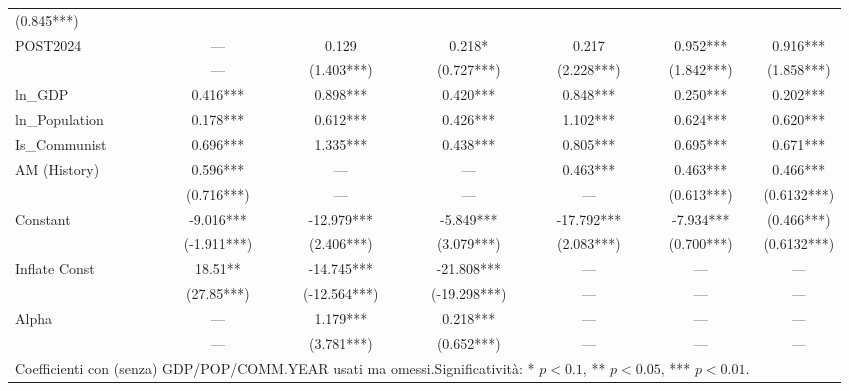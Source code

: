 \begin{table}[H]
{\begin{tabular}{l cccccc}
                (0.845***) \\
POST2024        & ---       & 0.129     & 0.218*    & 0.217     & 0.952*** &
0.916***  \\
                & ---       & (1.403***)& (0.727***)& (2.228***) & (1.842***) &
                (1.858***) \\
\midrule
ln\_GDP         & 0.416***  & 0.898***  & 0.420***  & 0.848***   & 0.250***  &
0.202***     \\
ln\_Population   & 0.178***  & 0.612***  & 0.426***  & 1.102***  & 0.624***  &
0.620***     \\
Is\_Communist    & 0.696***  & 1.335***  & 0.438***  & 0.805***  & 0.695***  &
0.671***     \\
AM (History)    & 0.596***  & ---       & ---       & 0.463***       & 0.463*** &
0.466***      \\
                & (0.716***)  & ---       & ---       & ---       & (0.613***) &
                (0.6132***) \\
\midrule
Constant        & -9.016*** & -12.979***& -5.849*** & -17.792***    & -7.934***
& (0.466***)       \\
                & (-1.911***)& (2.406***)& (3.079***)& (2.083***)   & (0.700***)
                & (0.6132***)      \\
Inflate Const   & 18.51**   & -14.745***& -21.808***& ---           & --- & ---
\\
                & (27.85***)& (-12.564***)& (-19.298***)& ---       & --- & ---
                \\
Alpha           & ---       & 1.179***  & 0.218***  & ---           & --- & ---
\\
                & ---       & (3.781***)& (0.652***)& ---           & --- & ---
                \\
\bottomrule
\multicolumn{6}{l}{\normalsize Coefficienti con (senza) GDP/POP/COMM.\@ YEAR
usati ma omessi.\@ Significatività: * $p<0.1$, ** $p<0.05$, *** $p<0.01$.} \\
\end{tabular}%
}
\end{table}


